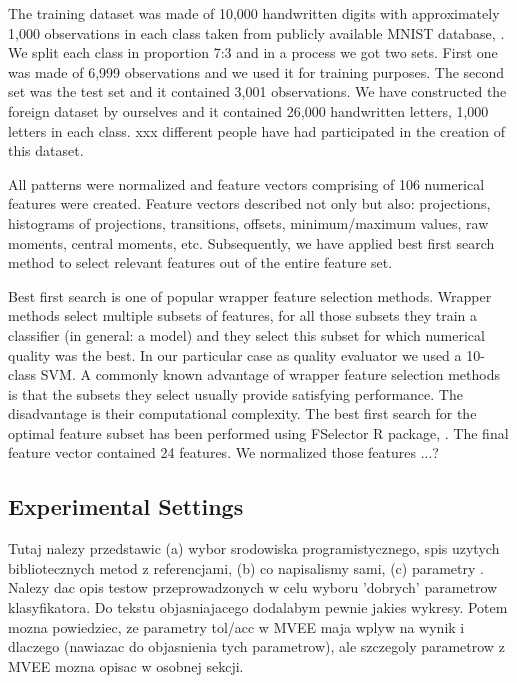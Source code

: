 \documentclass{llncs}
\begin{document}
The training dataset was made of 10,000 handwritten digits with approximately 1,000 observations in each class taken from publicly available MNIST database, \cite{LeCunCortesBurges}. We split each class in proportion 7:3 and in a process we got two sets. First one was made of 6,999 observations and we used it for training purposes. The second set was the test set and it contained 3,001 observations. 
We have constructed the foreign dataset by ourselves and it contained 26,000 handwritten letters, 1,000 letters in each class. xxx different people have had participated in the creation of this dataset.

All patterns were normalized and feature vectors comprising of 106 numerical features were created. Feature vectors described not only but also: projections, histograms of projections, transitions, offsets, minimum/maximum values, raw moments, central moments, etc. Subsequently, we have applied best first search method to select relevant features out of the entire feature set. 

Best first search is one of popular wrapper feature selection methods. Wrapper methods select multiple subsets of features, for all those subsets they train a classifier (in general: a model) and they select this subset for which numerical quality was the best. In our particular case as quality evaluator we used a 10-class SVM. A commonly known advantage of wrapper feature selection methods is that the subsets they select usually provide satisfying performance. The disadvantage is their computational complexity. The best first search for the optimal feature subset has been performed using FSelector R package, \cite{Romanski}. The final feature vector contained 24 features. {\color{red} We normalized those features ...?}


\subsection{Experimental Settings}

{\color{blue}Tutaj nalezy przedstawic (a) wybor srodowiska programistycznego, spis uzytych bibliotecznych metod z referencjami, (b) co napisalismy sami, (c) parametry . Nalezy dac opis testow przeprowadzonych w celu wyboru 'dobrych' parametrow klasyfikatora. Do tekstu objasniajacego dodalabym pewnie jakies wykresy. Potem mozna powiedziec, ze parametry tol/acc w MVEE maja wplyw na wynik i dlaczego (nawiazac do objasnienia tych parametrow), ale szczegoly parametrow z MVEE mozna opisac w osobnej sekcji.}
\end{document}
